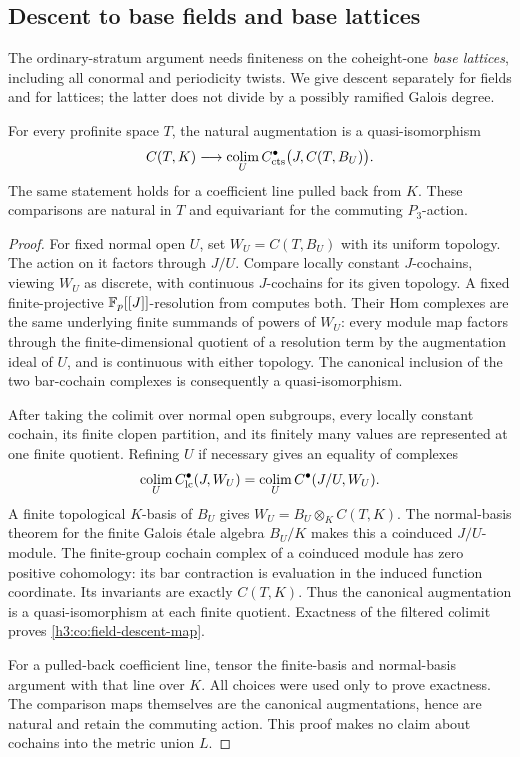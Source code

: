 \subsection{Descent to base fields and base lattices}

The ordinary-stratum argument needs finiteness on the coheight-one
\emph{base lattices}, including all conormal and periodicity twists.
We give descent separately for fields and for lattices; the latter does
not divide by a possibly ramified Galois degree.

\begin{lemma}\label{h3:co:field-descent}
For every profinite space $T$, the natural augmentation is a
quasi-isomorphism
\begin{equation}\label{h3:co:field-descent-map}
 C(T,K)\longrightarrow
 \operatorname*{colim}_U C^\bullet_{\mathrm{cts}}\bigl(J,C(T,B_U)\bigr).
\end{equation}
The same statement holds for a coefficient line pulled back from $K$.
These comparisons are natural in $T$ and equivariant for the commuting
$P_3$-action.
\end{lemma}

\begin{proof}
For fixed normal open $U$, set $W_U=C(T,B_U)$ with its uniform topology.
The action on it factors through $J/U$.  Compare locally constant
$J$-cochains, viewing $W_U$ as discrete, with continuous $J$-cochains
for its given topology.  A fixed finite-projective
$\mathbb F_p[[J]]$-resolution from  computes both.
Their Hom complexes are the same underlying finite summands of powers
of $W_U$: every module map factors through the finite-dimensional
quotient of a resolution term by the augmentation ideal of $U$, and
is continuous with either topology.  The canonical inclusion of the
two bar-cochain complexes is consequently a quasi-isomorphism.

After taking the colimit over normal open subgroups, every locally
constant cochain, its finite clopen partition, and its finitely many
values are represented at one finite quotient.  Refining $U$ if
necessary gives an equality of complexes
\[
 \operatorname*{colim}_U C^\bullet_{\mathrm{lc}}(J,W_U)
 =\operatorname*{colim}_U C^\bullet(J/U,W_U).
\]
A finite topological $K$-basis of $B_U$ gives
$W_U=B_U\otimes_K C(T,K)$.  The normal-basis theorem for the finite
Galois \'etale algebra $B_U/K$ makes this a coinduced $J/U$-module.
The finite-group cochain complex of a coinduced module has zero
positive cohomology: its bar contraction is evaluation in the induced
function coordinate.  Its invariants are exactly $C(T,K)$.
Thus the canonical augmentation is a quasi-isomorphism at each finite
quotient.  Exactness of the filtered colimit proves
\eqref{h3:co:field-descent-map}.

For a pulled-back coefficient line, tensor the finite-basis and
normal-basis argument with that line over $K$.  All choices were used
only to prove exactness.  The comparison maps themselves are the
canonical augmentations, hence are natural and retain the commuting
action.  This proof makes no claim about cochains into the metric
union $L$.
\end{proof}

